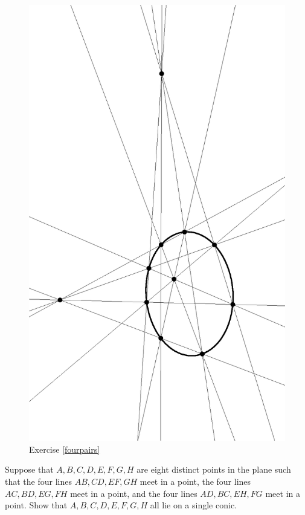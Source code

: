 \begin{figure}[!htb]
\centering
\includegraphics[scale=0.5,angle=270]{fourpairs.eps}
\caption{Exercise \ref{fourpairs}}
\end{figure}

\begin{exer}\label{fourpairs} Suppose that $A,B,C,D,E,F,G,H$ are eight distinct points in the plane such that the four lines $AB, CD, EF, GH$ meet in a point, the four lines $AC, BD, EG, FH$ meet in a point, and the four lines $AD, BC, EH, FG$ meet in a point. Show that $A,B,C,D,E,F,G,H$ all lie on a single conic.
\end{exer}

